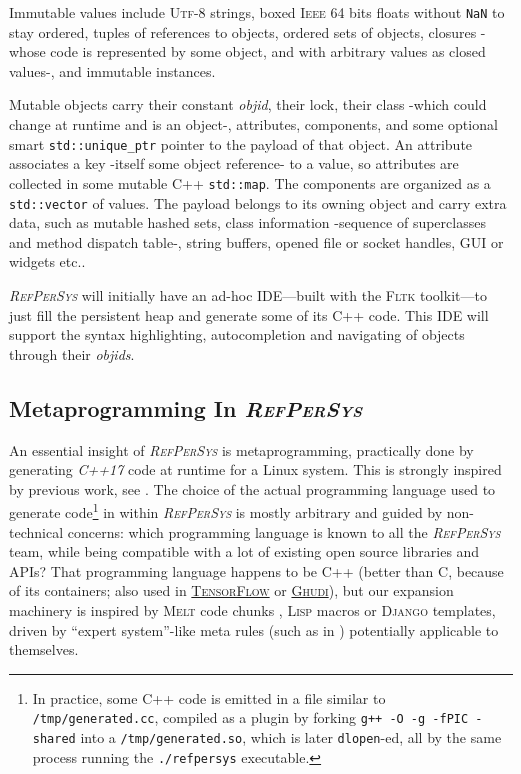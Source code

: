 \documentclass{IEEEtran}
\newcommand{\RefPerSys}{{\textit{\textsc{RefPerSys}}}}
\begin{document}
Immutable values include \textsc{Utf-8} strings, boxed \textsc{Ieee}
64 bits floats without \texttt{NaN} to stay ordered, tuples of
references to objects, ordered sets of objects, closures -whose code
is represented by some object, and with arbitrary values as closed
values-, and immutable instances.

Mutable objects carry their constant \emph{objid}, their lock, their
class -which could change at runtime and is an object-, attributes,
components, and some optional smart \texttt{std::unique\_ptr} pointer
to the payload of that object. An attribute associates a key -itself
some object reference- to a value, so attributes are collected in some
mutable C++ \texttt{std::map}. The components are organized as a
\texttt{std::vector} of values. The payload belongs to its owning
object and carry extra data, such as mutable hashed sets, class
information -sequence of superclasses and method dispatch table-,
string buffers, opened file or socket handles, GUI or widgets etc..

{\RefPerSys} will initially have an ad-hoc IDE---built with the \textsc{Fltk}
toolkit---to just fill the persistent heap and generate some of its C++
code. This IDE will support the syntax highlighting, autocompletion and
navigating of objects through their \emph{objids}.

\subsection{Metaprogramming In \RefPerSys}
\label{subsec:metaprogramming}

An essential insight of {\RefPerSys} is metaprogramming, practically
done by generating \emph{C++17} code at runtime for a Linux
system. This is strongly inspired by previous work, see
\cite{Pitrat:1996:FGCS, Pitrat:2009:ArtifBeings,
  Starynkevitch:2019:bismon-draft, Starynkevitch-DSL2011,
  Starynkevitch:2007:Multistage}. The choice of the actual programming
language used to generate code\footnote{In practice, some C++ code is
emitted in a file similar to \texttt{/tmp/generated.cc}, compiled as a
plugin by forking \texttt{g++ -O -g -fPIC -shared} into a
\texttt{/tmp/generated.so}, which is later \texttt{dlopen}-ed, all by
the same process running the \texttt{./refpersys} executable.} in
within {\RefPerSys} is mostly arbitrary and guided by non-technical
concerns: which programming language is known to all the {\RefPerSys}
team, while being compatible with a lot of existing open source
libraries and APIs? That programming language happens to be C++
(better than C, because of its containers; also used in
\href{http://tensorflow.org}{\textsc{TensorFlow}} or
\href{https://gudhi.inria.fr/}{\textsc{Ghudi}}), but our expansion
machinery is inspired by \textsc{Melt} code chunks
\cite{Starynkevitch-DSL2011}, \textsc{Lisp} macros
\cite{Queinnec:1996:LSP} or \textsc{Django} templates, driven by
``expert system''-like meta rules (such as in \cite{Pitrat:1996:FGCS})
potentially applicable to themselves.
\end{document}
